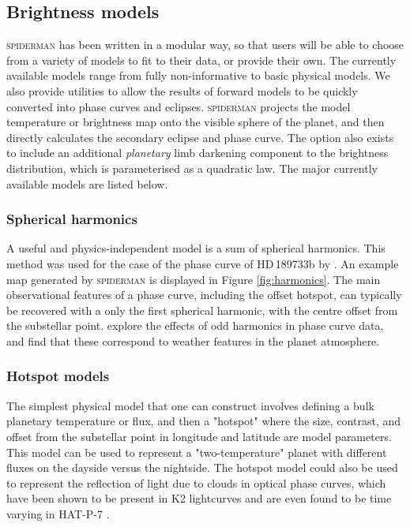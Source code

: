 \documentclass[a4paper,fleqn,usenatbib]{mnras}
\begin{document}
\subsection{Brightness models}\label{sec:temp model}

\textsc{spiderman} has been written in a modular way, so that users will be able to choose from a variety of models to fit to their data, or provide their own. The currently available models range from fully non-informative to basic physical models. We also provide utilities to allow the results of forward models to be quickly converted into phase curves and eclipses. \textsc{spiderman} projects the model temperature or brightness map onto the visible sphere of the planet, and then directly calculates the secondary eclipse and phase curve. The option also exists to include an additional \emph{planetary} limb darkening component to the brightness distribution, which is parameterised as a quadratic law. The major currently available models are listed below.

\subsubsection{Spherical harmonics}

A useful and physics-independent model is a sum of spherical harmonics. This method was used for the case of the phase curve of HD\,189733b by \citet{Majeau2012}. An example map generated by \textsc{spiderman} is displayed in Figure \ref{fig:harmonics}. The main observational features of a phase curve, including the offset hotspot, can typically be recovered with a only the first spherical harmonic, with the centre offset from the substellar point. \citep{Cowan2016} explore the effects of odd harmonics in phase curve data, and find that these correspond to weather features in the planet atmosphere.

\subsubsection{Hotspot models}

The simplest physical model that one can construct involves defining a bulk planetary temperature or flux, and then a "hotspot" where the size, contrast, and offset from the substellar point in longitude and latitude are model parameters. This model can be used to represent a "two-temperature" planet with different fluxes on the dayside versus the nightside. The hotspot model could also be used to represent the reflection of light due to clouds in optical phase curves, which have been shown to be present in K2 lightcurves \citep{Demory2013} and are even found to be time varying in HAT-P-7 \citep{Armstrong2016}.
\end{document}
